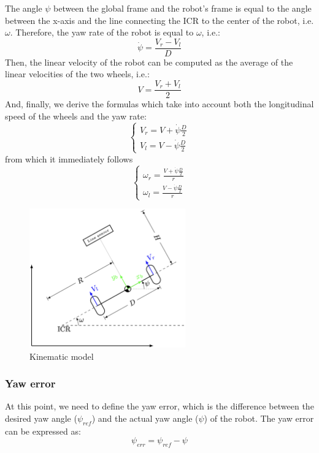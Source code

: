 The angle $\psi$ between the global frame and the robot's frame is equal to the angle between the x-axis and the line connecting the ICR to the center of the robot, i.e. $\omega$.
Therefore, the yaw rate of the robot is equal to $\omega$, i.e.:
\begin{equation}
    \dot{\psi} = \frac{V_r - V_l}{D}
\end{equation}
Then, the linear velocity of the robot can be computed as the average of the linear velocities of the two wheels, i.e.:
\begin{equation}
    V = \frac{V_r + V_l}{2}
\end{equation}
And, finally, we derive the formulas which take into account both the longitudinal speed of the wheels and the yaw rate:
\begin{equation}
\begin{cases}
    V_r = V + \dot{\psi} \frac{D}{2} \\
    V_l = V - \dot{\psi} \frac{D}{2}
\end{cases}
\end{equation}
from which it immediately follows
\begin{equation}
\begin{cases}
    \label{eq:omega}
    \omega_r = \frac{V + \dot{\psi} \frac{D}{2}}{r} \\
    \omega_l = \frac{V - \dot{\psi} \frac{D}{2}}{r}
\end{cases}
\end{equation}
\begin{figure} [H]
    \centering
    \includegraphics[width=0.6\textwidth]{lab4/figures/kinematic_model.png}
    \caption{Kinematic model}
    \label{fig:kinematic_model}
\end{figure}

\subsubsection{Yaw error}
At this point, we need to define the yaw error, which is the difference between the desired yaw angle ($\psi_{ref}$) and the actual yaw angle ($\psi$) of the robot. The yaw error can be expressed as:
\begin{equation}
    \psi_{err} = \psi_{ref} - \psi
\end{equation}

